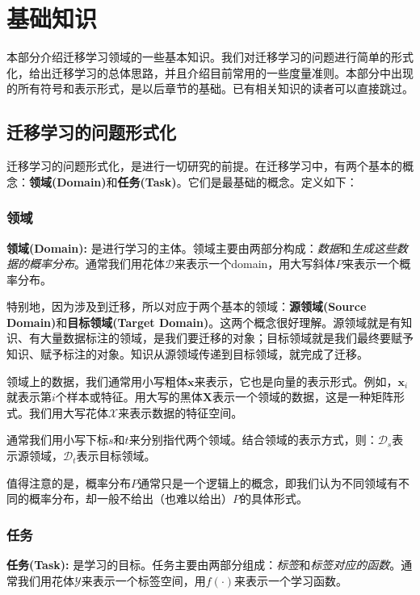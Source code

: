 \newpage
\section{基础知识}

本部分介绍迁移学习领域的一些基本知识。我们对迁移学习的问题进行简单的形式化，给出迁移学习的总体思路，并且介绍目前常用的一些度量准则。本部分中出现的所有符号和表示形式，是以后章节的基础。已有相关知识的读者可以直接跳过。

\subsection{迁移学习的问题形式化}

迁移学习的问题形式化，是进行一切研究的前提。在迁移学习中，有两个基本的概念：\textbf{领域(Domain)}和\textbf{任务(Task)}。它们是最基础的概念。定义如下：

\subsubsection{领域}

\textbf{领域(Domain):} 是进行学习的主体。领域主要由两部分构成：\textit{数据}和\textit{生成这些数据的概率分布}。通常我们用花体$\mathcal{D}$来表示一个domain，用大写斜体$P$来表示一个概率分布。

特别地，因为涉及到迁移，所以对应于两个基本的领域：\textbf{源领域(Source Domain)}和\textbf{目标领域(Target Domain)}。这两个概念很好理解。源领域就是有知识、有大量数据标注的领域，是我们要迁移的对象；目标领域就是我们最终要赋予知识、赋予标注的对象。知识从源领域传递到目标领域，就完成了迁移。

领域上的数据，我们通常用小写粗体$\mathbf{x}$来表示，它也是向量的表示形式。例如，$\mathbf{x}_i$就表示第$i$个样本或特征。用大写的黑体$\mathbf{X}$表示一个领域的数据，这是一种矩阵形式。我们用大写花体$\mathcal{X}$来表示数据的特征空间。

通常我们用小写下标$s$和$t$来分别指代两个领域。结合领域的表示方式，则：$\mathcal{D}_s$表示源领域，$\mathcal{D}_t$表示目标领域。

值得注意的是，概率分布$P$通常只是一个逻辑上的概念，即我们认为不同领域有不同的概率分布，却一般不给出（也难以给出）$P$的具体形式。

\subsubsection{任务}

\textbf{任务(Task):} 是学习的目标。任务主要由两部分组成：\textit{标签}和\textit{标签对应的函数}。通常我们用花体$\mathcal{Y}$来表示一个标签空间，用$f(\cdot)$来表示一个学习函数。

